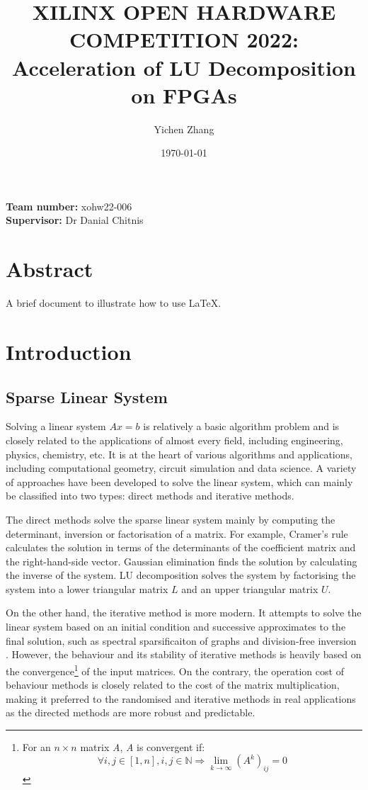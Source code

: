 \documentclass[11pt,a4paper]{article}
\title{XILINX OPEN HARDWARE COMPETITION 2022: Acceleration of LU Decomposition on FPGAs}
\author{Yichen Zhang}
\date{\today}
\begin{document}
\maketitle
\begin{flushright}
    \textbf{Team number:} xohw22-006\\
    \textbf{Supervisor:} Dr Danial Chitnis
\end{flushright}

\section*{Abstract}
    A brief document to illustrate how to use \LaTeX.

\section{Introduction}
\subsection{Sparse Linear System}
Solving a linear system \(Ax=b\) is relatively a basic algorithm problem and is closely related to the applications of almost every field, including engineering, physics, chemistry, etc. It is at the heart of various algorithms and applications, including computational geometry, circuit simulation and data science. A variety of approaches have been developed to solve the linear system, which can mainly be classified into two types: direct methods and iterative methods.

The direct methods solve the sparse linear system mainly by computing the determinant, inversion or factorisation of a matrix. For example, Cramer's rule calculates the solution in terms of the determinants of the coefficient matrix and the right-hand-side vector. Gaussian elimination finds the solution by calculating the inverse of the system. LU decomposition solves the system by factorising the system into a lower triangular matrix \(L\) and an upper triangular matrix \(U\).

On the other hand, the iterative method is more modern. It attempts to solve the linear system based on an initial condition and successive approximates to the final solution, such as spectral sparsificaiton of graphs \cite{Spielman2008} and division-free inversion \cite{Koutis2012}. However, the behaviour and its stability of iterative methods is heavily based on the convergence\footnote{For an \(n\times n\) matrix \emph{A}, \emph{A} is convergent if: \vspace{-1ex}\[\forall i,j\in[1,n],i,j\in\mathbb{N}\Rightarrow \lim_{k\to\infty}\left(A^k\right)_{ij}=0\]} of the input matrices. On the contrary, the operation cost of behaviour methods is closely related to the cost of the matrix multiplication, making it preferred to the randomised and iterative methods in real applications as the directed methods are more robust and predictable.
\end{document}
